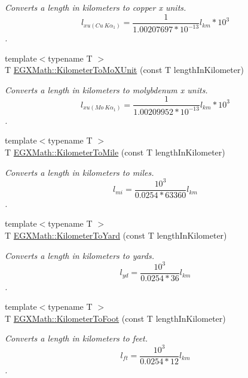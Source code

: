 \begin{DoxyCompactItemize}
\begin{DoxyCompactList}\small\item\em Converts a length in kilometers to copper x units. \[ l_{xu(Cu\ K\alpha_1)}= \frac{1}{1.00207697*10^{-13}} l_{km} * 10^{3}\]. \end{DoxyCompactList}\item 
{\footnotesize template$<$typename T $>$ }\\T \mbox{\hyperlink{group___e_g_x_math-_conversions-_length_conversions-_s_i-_kilometer-_non-_s_i_ga547782594ebd0cc3e565f6d32f9528df}{E\+G\+X\+Math\+::\+Kilometer\+To\+Mo\+X\+Unit}} (const T length\+In\+Kilometer)
\begin{DoxyCompactList}\small\item\em Converts a length in kilometers to molybdenum x units. \[ l_{xu(Mo\ K\alpha_1)}=\frac{1}{1.00209952*10^{-13}} l_{km} * 10^{3}\]. \end{DoxyCompactList}\item 
{\footnotesize template$<$typename T $>$ }\\T \mbox{\hyperlink{group___e_g_x_math-_conversions-_length_conversions-_s_i-_kilometer-_imperial_ga781cd502fe13eb76e4e6b8e1fa7d55ed}{E\+G\+X\+Math\+::\+Kilometer\+To\+Mile}} (const T length\+In\+Kilometer)
\begin{DoxyCompactList}\small\item\em Converts a length in kilometers to miles. \[ l_{mi}=\frac{10^{3}}{0.0254 * 63360} l_{km} \]. \end{DoxyCompactList}\item 
{\footnotesize template$<$typename T $>$ }\\T \mbox{\hyperlink{group___e_g_x_math-_conversions-_length_conversions-_s_i-_kilometer-_imperial_ga98f724c96246bb6dcb517fc64ff5ade1}{E\+G\+X\+Math\+::\+Kilometer\+To\+Yard}} (const T length\+In\+Kilometer)
\begin{DoxyCompactList}\small\item\em Converts a length in kilometers to yards. \[ l_{yd}= \frac{10^{3}}{0.0254 * 36} l_{km} \]. \end{DoxyCompactList}\item 
{\footnotesize template$<$typename T $>$ }\\T \mbox{\hyperlink{group___e_g_x_math-_conversions-_length_conversions-_s_i-_kilometer-_imperial_ga8e07a35f01e011462db88b5cb2896416}{E\+G\+X\+Math\+::\+Kilometer\+To\+Foot}} (const T length\+In\+Kilometer)
\begin{DoxyCompactList}\small\item\em Converts a length in kilometers to feet. \[ l_{ft}= \frac{10^{3}}{0.0254 * 12} l_{km} \]. \end{DoxyCompactList}\item 

\end{DoxyCompactItemize}
